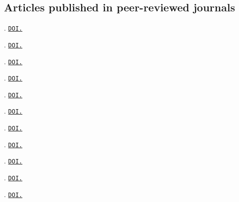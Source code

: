 \documentclass[12pt,a4paper]{moderncv}
\begin{document}
 \subsection{Articles published in peer-reviewed journals}
\begin{etaremune}[leftmargin=2.75cm,itemsep=2pt]

\item {}. \href{https://doi.org/10.1016/j.crsust.2025.100295}{\texttt{DOI.}}
\item {}. \href{https://www.doi.org/10.1016/j.erss.2024.103819}{\texttt{DOI.}}
\item {}. \href{https://www.doi.org/10.1371/journal.pclm.0000132}{\texttt{DOI.}} 
\item {}. \href{https://www.doi.org/10.1016/j.trd.2023.103626}{\texttt{DOI.}} 
\item {}. \href{https://www.doi.org/10.1080/01441647.2021.2023693}{\texttt{DOI.}} 
\item  {}. \href{https://www.doi.org/10.1016/j.enpol.2022.113047}{\texttt{DOI.}} 
\item {}. \href{https://www.doi.org/10.1016/j.tra.2022.03.025}{\texttt{DOI.}} 
\item {}. \href{https://www.doi.org/10.1016/j.jclepro.2022.131774}{\texttt{DOI.}} 
\item {}. \href{https://www.doi.org/10.1088/1748-9326/ac3531}{\texttt{DOI.}}
\item {}. \href{https://www.doi.org/10.1016/j.trd.2020.102615}{\texttt{DOI.}} 
\item {}. \href{https://www.doi.org/10.1088/1748-9326/ab90a5}{\texttt{DOI.}} 
\end{etaremune}
\end{document}
